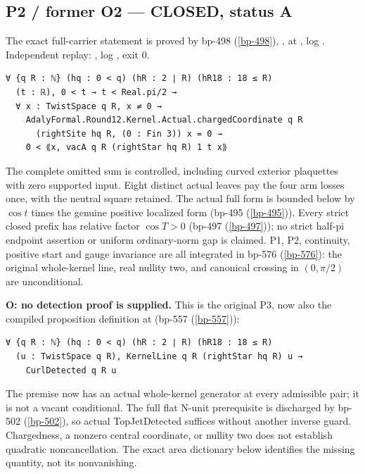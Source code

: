 \subsection{P2 / former O2 — CLOSED, status A}
\label{open-positive}
The exact full-carrier statement is proved by bp-498 (\ref{bp-498}), \texttt{}, at \texttt{}, log \texttt{}. Independent replay: \texttt{}, log \texttt{}, exit 0.

\begin{verbatim}
∀ {q R : ℕ} (hq : 0 < q) (hR : 2 ∣ R) (hR18 : 18 ≤ R)
  (t : ℝ), 0 < t → t < Real.pi/2 →
  ∀ x : TwistSpace q R, x ≠ 0 →
    AdalyFormal.Round12.Kernel.Actual.chargedCoordinate q R
      (rightSite hq R, (0 : Fin 3)) x = 0 →
    0 < ⟪x, vacA q R (rightStar hq R) 1 t x⟫
\end{verbatim}

The complete omitted sum is controlled, including curved exterior plaquettes with zero supported input. Eight distinct actual leaves pay the four arm losses once, with the neutral square retained. The actual full form is bounded below by \(\cos t\) times the genuine positive localized form (bp-495 (\ref{bp-495})). Every strict closed prefix has relative factor \(\cos T>0\) (bp-497 (\ref{bp-497})); no strict half-pi endpoint assertion or uniform ordinary-norm gap is claimed. P1, P2, continuity, positive start and gauge invariance are all integrated in bp-576 (\ref{bp-576}): the original whole-kernel line, real nullity two, and canonical crossing in \((0,\pi/2)\) are unconditional.

\begin{theorem}
\label{open-detection}
\textbf{O: no detection proof is supplied.} This is the original P3, now also the compiled proposition definition \texttt{} at \texttt{} (bp-557 (\ref{bp-557})):

\begin{verbatim}
∀ {q R : ℕ} (hq : 0 < q) (hR : 2 ∣ R) (hR18 : 18 ≤ R)
  (u : TwistSpace q R), KernelLine q R (rightStar hq R) u →
    CurlDetected q R u
\end{verbatim}

The premise now has an actual whole-kernel generator at every admissible pair; it is not a vacant conditional. The full flat N-unit prerequisite is discharged by bp-502 (\ref{bp-502}), so actual TopJetDetected suffices without another inverse guard. Chargedness, a nonzero central coordinate, or nullity two does not establish quadratic noncancellation. The exact area dictionary below identifies the missing quantity, not its nonvanishing.

\end{theorem}

